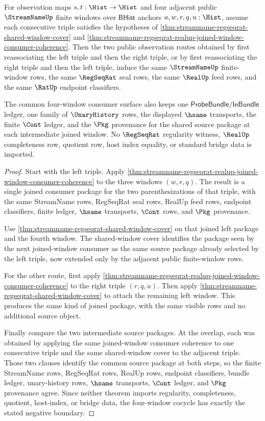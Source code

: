 \begin{theorem}
\label{thm:realup-streamname-regseqrat-triple-window-cocycle}
For observation maps $s,t:\Hist\to\Hist$ and four adjacent public
$\StreamNameUp$ finite windows over $\mathsf{BHist}$ anchors
$a,w,r,q,u:\Hist$, assume each consecutive triple satisfies the hypotheses of
\autoref{thm:streamname-regseqrat-shared-window-cover} and
\autoref{thm:streamname-regseqrat-realup-joined-window-consumer-coherence}. Then
the two public observation routes obtained by first reassociating the left
triple and then the right triple, or by first reassociating the right triple and
then the left triple, induce the same $\StreamNameUp$ finite-window rows, the
same $\RegSeqRat$ seal rows, the same $\RealUp$ feed rows, and the same
$\RatUp$ endpoint classifiers.

The common four-window consumer surface also keeps one
$\mathsf{ProbeBundle}/\mathsf{InBundle}$ ledger, one family of $\UnaryHistory$
rows, the displayed $\hsame$ transports, the finite $\Cont$ ledger, and the
$\Pkg$ provenance for the shared source package at each intermediate joined
window. No $\RegSeqRat$ regularity witness, $\RealUp$ completeness row,
quotient row, host index equality, or standard bridge data is imported.
\end{theorem}
\begin{proof}
Start with the left triple. Apply
\autoref{thm:streamname-regseqrat-realup-joined-window-consumer-coherence} to
the three windows $(w,r,q)$. The result is a single joined consumer package for
the two parenthesizations of that triple, with the same StreamName rows,
RegSeqRat seal rows, RealUp feed rows, endpoint classifiers, finite ledger,
$\hsame$ transports, $\Cont$ rows, and $\Pkg$ provenance.

Use \autoref{thm:streamname-regseqrat-shared-window-cover} on that joined left
package and the fourth window. The shared-window cover identifies the package
seen by the next joined-window consumer as the same source package already
selected by the left triple, now extended only by the adjacent public
finite-window rows.

For the other route, first apply
\autoref{thm:streamname-regseqrat-realup-joined-window-consumer-coherence} to
the right triple $(r,q,u)$. Then apply
\autoref{thm:streamname-regseqrat-shared-window-cover} to attach the remaining
left window. This produces the same kind of joined package, with the same
visible rows and no additional source object.

Finally compare the two intermediate source packages. At the overlap, each was
obtained by applying the same joined-window consumer coherence to one
consecutive triple and the same shared-window cover to the adjacent triple.
Those two clauses identify the common source package at both steps, so the
finite StreamName rows, RegSeqRat rows, RealUp rows, endpoint classifiers,
bundle ledger, unary-history rows, $\hsame$ transports, $\Cont$ ledger, and
$\Pkg$ provenance agree. Since neither theorem imports regularity,
completeness, quotient, host-index, or bridge data, the four-window cocycle has
exactly the stated negative boundary.
\end{proof}

